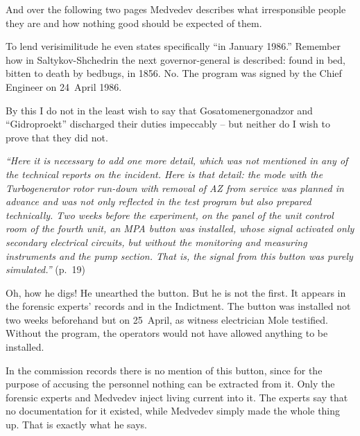 \documentclass[openright]{bookest}
\begin{document}
And over the following two pages Medvedev describes what irresponsible people they are and how nothing good should be expected of them.

To lend verisimilitude he even states specifically ``in January 1986.'' Remember how in Saltykov-Shchedrin the next governor-general is described: found in bed, bitten to death by bedbugs, in 1856. No. The program was signed by the Chief Engineer on 24~April 1986.

By this I do not in the least wish to say that Gosatomenergonadzor and ``Gidroproekt'' discharged their duties impeccably -- but neither do I wish to prove that they did not.

\begin{personal}
\textit{``Here it is necessary to add one more detail, which was not mentioned in any of the technical reports on the incident. Here is that detail: the mode with the Turbogenerator rotor run-down with removal of AZ from service was planned in advance and was not only reflected in the test program but also prepared technically. Two weeks before the experiment, on the panel of the unit control room of the fourth unit, an MPA button was installed, whose signal activated only secondary electrical circuits, but without the monitoring and measuring instruments and the pump section. That is, the signal from this button was purely simulated.''} (p.~19)
\end{personal}

Oh, how he digs! He unearthed the button. But he is not the first. It appears in the forensic experts' records and in the Indictment. The button was installed not two weeks beforehand but on 25~April, as witness electrician Mole testified. Without the program, the operators would not have allowed anything to be installed.

In the commission records there is no mention of this button, since for the purpose of accusing the personnel nothing can be extracted from it. Only the forensic experts and Medvedev inject living current into it. The experts say that no documentation for it existed, while Medvedev simply made the whole thing up. That is exactly what he says.
\end{document}
